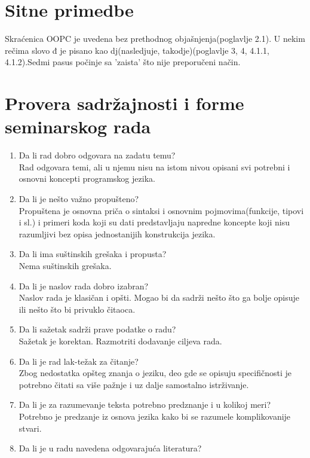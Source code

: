 \documentclass[a4paper]{report}
\begin{document}
\section{Sitne primedbe}
Skraćenica OOPC je uvedena bez prethodnog objašnjenja(poglavlje 2.1). U nekim rečima slovo đ je pisano kao dj(nasledjuje, takodje)(poglavlje 3, 4, 4.1.1, 4.1.2).Sedmi pasus počinje sa 'zaista' što nije preporučeni način.
\section{Provera sadržajnosti i forme seminarskog rada}

\begin{enumerate}
\item Da li rad dobro odgovara na zadatu temu?\\
Rad odgovara temi, ali u njemu nisu na istom nivou opisani svi potrebni i osnovni koncepti programskog jezika.
\item Da li je nešto važno propušteno?\\
Propuštena je osnovna priča o sintaksi i osnovnim pojmovima(funkcije, tipovi i sl.) i primeri koda koji su dati predstavljaju napredne koncepte koji nisu razumljivi bez opisa jednostanijih konstrukcija jezika.
\item Da li ima suštinskih grešaka i propusta?\\
Nema suštinskih grešaka. 
\item Da li je naslov rada dobro izabran?\\
Naslov rada je klasičan i opšti. Mogao bi da sadrži nešto što ga bolje opisuje ili nešto što bi privuklo čitaoca.
\item Da li sažetak sadrži prave podatke o radu?\\
Sažetak je korektan. Razmotriti dodavanje ciljeva rada.
\item Da li je rad lak-težak za čitanje?\\
Zbog nedostatka opšteg znanja o jeziku, deo gde se opisuju specifičnosti je potrebno čitati sa više pažnje i uz dalje samostalno istrživanje.
\item Da li je za razumevanje teksta potrebno predznanje i u kolikoj meri?\\
Potrebno je predzanje iz osnova jezika kako bi se razumele komplikovanije stvari.
\item Da li je u radu navedena odgovarajuća literatura?\\

\end{enumerate}
\end{document}
